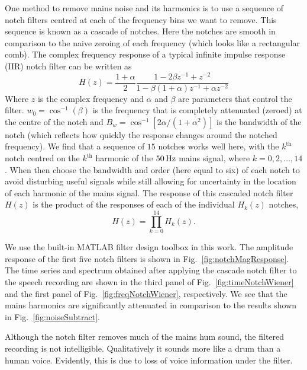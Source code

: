 \documentclass[paper-main.tex]{subfiles}
\begin{document}
One method to remove mains noise and its harmonics is to use a sequence of notch filters centred at each of the frequency bins we want to remove. This sequence is known as a cascade of notches. Here the notches are smooth in comparison to the naive zeroing of each frequency (which looks like a rectangular comb). The complex frequency response of a typical infinite impulse response (IIR) notch filter can be written as \citep{10.5555/541204}
\begin{equation}
    \label{eqn:notch}
    H(z)=\frac{1+\alpha}{2}\frac{1-2\beta z^{-1}+z^{-2}}{1-\beta(1+\alpha)z^{-1}+\alpha z^{-2}}
\end{equation}
Where $z$ is the complex frequency and $\alpha$ and $\beta$ are parameters that control the filter. $w_0=\cos^{-1}(\beta)$ is the frequency that is completely attenuated (zeroed) at the centre of the notch and $B_w=\cos^{-1}[2\alpha/(1+\alpha^2)]$ is the bandwidth of the notch (which reflects how quickly the response changes around the notched frequency).
We find that a sequence of $15$ notches works well here, with the $k^\mathrm{th}$ notch centred on the $k^\mathrm{th}$ harmonic of the $50\,{\rm Hz}$ mains signal, where $k=0,2,\dots,14$. When then choose the bandwidth and order (here equal to six) of each notch to avoid disturbing useful signals while still allowing for uncertainty in the location of each harmonic of the mains signal. The response of this cascaded notch filter $H(z)$ is the product of the responses of each of the individual $H_k(z)$ notches,
\begin{equation}
    \label{eqn:notch15}
    H(z) = \prod_{k=0}^{14} H_k(z).
\end{equation}

We use the built-in MATLAB filter design toolbox in this work. 
The amplitude response of the first five notch filters is shown in Fig.~\ref{fig:notchMagResponse}. 
The time series and spectrum obtained after applying the cascade notch filter to the speech recording are shown in the third panel of Fig.~\ref{fig:timeNotchWiener} and the first panel of Fig.~\ref{fig:freqNotchWiener}, respectively. We see that the mains harmonics are significantly attenuated in comparison to the results shown in Fig.~\ref{fig:noiseSubtract}. 

Although the notch filter removes much of the mains hum sound, the filtered recording is not intelligible. Qualitatively it sounds more like a drum than a human voice. Evidently, this is due to loss of voice information under the filter.
\end{document}
